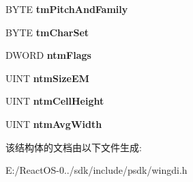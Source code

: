 \begin{DoxyCompactItemize}
\item 
\mbox{\label{structtag_n_e_w_t_e_x_t_m_e_t_r_i_c_a_ad46a17532d67b5767e838c9a47e4a7b2}} 
B\+Y\+TE {\bfseries tm\+Pitch\+And\+Family}
\item 
\mbox{\label{structtag_n_e_w_t_e_x_t_m_e_t_r_i_c_a_a8d3afb9987a85a6056804b4d496f528d}} 
B\+Y\+TE {\bfseries tm\+Char\+Set}
\item 
\mbox{\label{structtag_n_e_w_t_e_x_t_m_e_t_r_i_c_a_a033524f87d79601b0491a722cb03294f}} 
D\+W\+O\+RD {\bfseries ntm\+Flags}
\item 
\mbox{\label{structtag_n_e_w_t_e_x_t_m_e_t_r_i_c_a_a26cc9dbb5de6ac6e6b4edd5fed96c329}} 
U\+I\+NT {\bfseries ntm\+Size\+EM}
\item 
\mbox{\label{structtag_n_e_w_t_e_x_t_m_e_t_r_i_c_a_abd59fca8678db8c60e852f711ffdfc08}} 
U\+I\+NT {\bfseries ntm\+Cell\+Height}
\item 
\mbox{\label{structtag_n_e_w_t_e_x_t_m_e_t_r_i_c_a_ae53858a55f05d89a9e6ad6eb4d6bd590}} 
U\+I\+NT {\bfseries ntm\+Avg\+Width}
\end{DoxyCompactItemize}


该结构体的文档由以下文件生成\+:\begin{DoxyCompactItemize}
\item 
E\+:/\+React\+O\+S-\/0../sdk/include/psdk/wingdi.\+h\end{DoxyCompactItemize}
